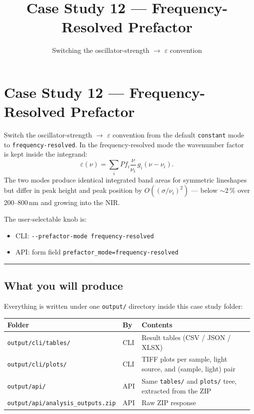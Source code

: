 \documentclass[
  11pt,
]{article}
\title{Case Study 12 --- Frequency-Resolved Prefactor}
\subtitle{Switching the oscillator-strength \(\to\) \(\varepsilon\) convention}
\author{}
\date{}
\providecommand{\tightlist}{
  \setlength{\itemsep}{0pt}\setlength{\parskip}{0pt}}
\begin{document}
\maketitle

{
\hypersetup{linkcolor=}
\setcounter{tocdepth}{2}
\tableofcontents
}
\hypertarget{case-study-12--frequency-resolved-prefactor}{
\section{Case Study 12 --- Frequency-Resolved
Prefactor}\label{case-study-12--frequency-resolved-prefactor}}

Switch the oscillator-strength \(\to\) \(\varepsilon\) convention from
the default \texttt{constant} mode to \texttt{frequency-resolved}. In
the frequency-resolved mode the wavenumber factor is kept inside the
integrand:
\[
\varepsilon(\nu) = \sum_i P f_i \frac{\nu}{\nu_i}\, g_i(\nu - \nu_i).
\]
The two modes produce identical integrated band areas for symmetric
lineshapes but differ in peak height and peak position by
\(O((\sigma/\nu_i)^2)\) --- below \(\sim\)2\,\% over 200--800\,nm and
growing into the NIR.

The user-selectable knob is:
\begin{itemize}
\tightlist
\item
  CLI: \texttt{-{}-prefactor-mode frequency-resolved}
\item
  API: form field \texttt{prefactor\_mode=frequency-resolved}
\end{itemize}

\begin{center}\rule{0.5\linewidth}{0.5pt}\end{center}

\hypertarget{what-you-will-produce}{
\subsection{What you will produce}\label{what-you-will-produce}}

Everything is written under one \texttt{output/} directory inside this
case study folder:

\begin{longtable}[]{@{}lll@{}}
\toprule
Folder & By & Contents \\
\midrule
\endhead
\texttt{output/cli/tables/} & CLI & Result tables (CSV / JSON / XLSX) \\
\texttt{output/cli/plots/} & CLI & TIFF plots per sample, light source,
and (sample, light) pair \\
\texttt{output/api/} & API & Same \texttt{tables/} and \texttt{plots/}
tree, extracted from the ZIP \\
\texttt{output/api/analysis\_outputs.zip} & API & Raw ZIP response \\
\bottomrule
\end{longtable}
\end{document}
